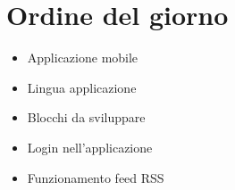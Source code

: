 \section{Ordine del giorno}
\begin{itemize}
    \item Applicazione mobile
    \item Lingua applicazione
    \item Blocchi da sviluppare
    \item Login nell'applicazione
    \item Funzionamento feed RSS
\end{itemize}